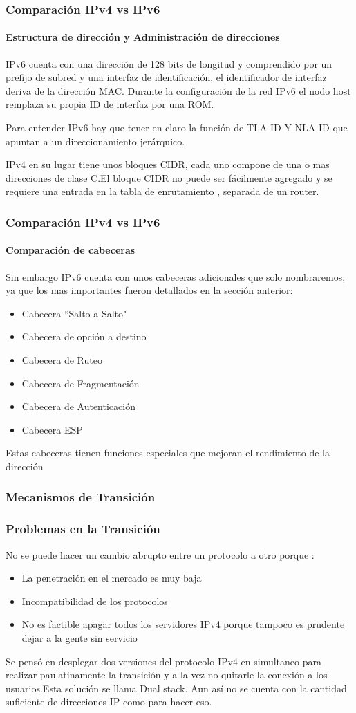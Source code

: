 \documentclass{beamer}
\begin{document}
\begin{frame}
\frametitle{Comparación IPv4 vs IPv6}
\framesubtitle{Estructura de dirección y Administración de direcciones}
IPv6 cuenta con una dirección de 128 bits de longitud y comprendido por un prefijo de subred y una 
interfaz de identificación, el identificador de interfaz deriva de la 
dirección MAC. Durante la configuración de la red IPv6 el nodo host remplaza su propia ID de 
interfaz por una ROM.
\par Para entender IPv6 hay que tener en claro la función de TLA ID Y NLA ID que apuntan a un direccionamiento jerárquico.
\par IPv4 en su lugar tiene unos bloques CIDR, cada uno compone de una o mas direcciones de clase C.El bloque CIDR no puede ser fácilmente agregado y se requiere una entrada en la tabla de enrutamiento , separada de un router.
\end{frame}


\begin{frame}
\frametitle{Comparación IPv4 vs IPv6}
\framesubtitle{Comparación de cabeceras}
Sin embargo IPv6 cuenta con unos cabeceras adicionales que solo nombraremos, ya que los mas 
importantes fueron detallados en la sección anterior:
\begin{itemize}
\item Cabecera ``Salto a Salto" 
\item Cabecera de opción a destino
\item  Cabecera  de Ruteo
\item Cabecera de Fragmentación
\item Cabecera de Autenticación
\item  Cabecera ESP
\end{itemize}
Estas cabeceras tienen funciones especiales que mejoran el rendimiento de la dirección
\end{frame}




\begin{frame}
\frametitle{Mecanismos de Transición}
\frametitle{Problemas en la Transición}
No se puede hacer un cambio abrupto entre un protocolo a otro porque : 
\begin{itemize}
\item La penetración en el mercado es muy baja 
\item Incompatibilidad de los protocolos
\item  No es factible apagar todos los servidores IPv4 porque tampoco es prudente dejar a la gente sin servicio

\end{itemize}
Se pensó en desplegar dos versiones del protocolo IPv4 en simultaneo para realizar paulatinamente la transición y a la vez  no quitarle la conexión a los usuarios.Esta solución se llama Dual stack.
Aun así no se cuenta con la cantidad suficiente de direcciones IP como para hacer eso.
\end{frame}
\end{document}
